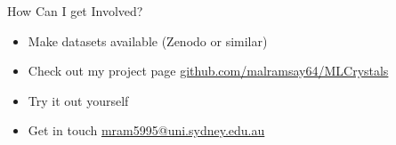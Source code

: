 \documentclass[aspectratio=169, 14pt]{beamer}
\begin{document}
\begin{frame}{How Can I get Involved?}

  \begin{itemize}
    \item Make datasets available (Zenodo or similar)
    \item Check out my project page \url{github.com/malramsay64/MLCrystals}
    \item Try it out yourself
    \item Get in touch \href{mailto:mram5995@uni.sydney.edu.au}{mram5995@uni.sydney.edu.au}
  \end{itemize}

\end{frame}
\end{document}
